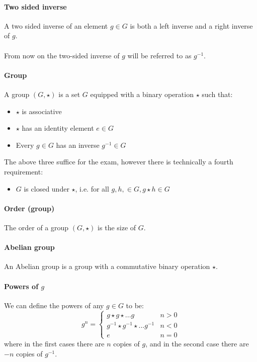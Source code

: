 \documentclass{article}
\begin{document}
\paragraph{Two sided inverse}
A two sided inverse of an element $ g \in G $ is both a left inverse and a right inverse of $ g $.
\\\\
From now on the two-sided inverse of $ g $ will be referred to as $ g^{-1} $.
\paragraph{Group}
A group $ (G, \star) $ is a set $ G $ equipped with a binary operation $ \star $ such that:
\begin{itemize}
\item $ \star $ is associative
\item $ \star $ has an identity element $ e \in G $
\item Every $ g \in G $ has an inverse $ g^{-1} \in G $
\end{itemize}
The above three suffice for the exam, however there is technically a fourth requirement:
\begin{itemize}
\item $ G $ is closed under $ \star $, i.e. for all $ g, h, \in G, g \star h \in G $
\end{itemize}
\paragraph{Order (group)}
The order of a group $ (G, \star) $ is the size of $ G $.
\paragraph{Abelian group}
An Abelian group is a group with a commutative binary operation $ \star $.
\paragraph{Powers of $ g $}
We can define the powers of any $ g \in G $ to be:
\begin{equation}
g^{n} = 
\begin{cases}
g \star g \star ... g & n > 0 \\
g^{-1} \star g^{-1} \star ... g^{-1} & n < 0 \\
e & n = 0
\end{cases}
\end{equation}
where in the first cases there are $ n $ copies of $ g $, and in the second case there are $ -n $ copies of $ g^{-1} $.
\end{document}
